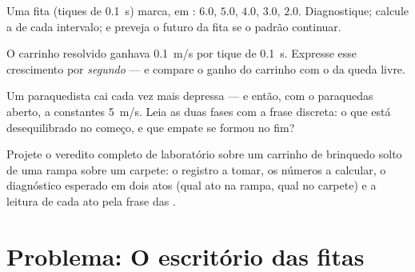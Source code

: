 \begin{exercise}[$\star\star$]\label{exo:g9:uniform-varied-motion:9}
Uma fita (tiques de \qty{0.1}{s}) marca, em : $6.0$,
$5.0$, $4.0$, $3.0$, $2.0$. Diagnostique; calcule a  de
cada intervalo; e preveja o futuro da fita se o padrão continuar.
\end{exercise}

\begin{exercise}[$\star\star$]\label{exo:g9:uniform-varied-motion:10}
O carrinho resolvido ganhava \qty{0.1}{m/s} por tique de
\qty{0.1}{s}. Expresse esse crescimento por \emph{segundo} --- e
compare o ganho do carrinho com o da queda livre.
\end{exercise}

\begin{exercise}[$\star\star$]\label{exo:g9:uniform-varied-motion:11}
Um paraquedista cai cada vez mais depressa --- e então, com o
paraquedas aberto, a constantes \qty{5}{m/s}. Leia as duas fases com
a frase discreta: o que está desequilibrado no começo, e que empate
se formou no fim?
\end{exercise}

\begin{exercise}[$\star\star\star$]\label{exo:g9:uniform-varied-motion:12}
Projete o veredito completo de laboratório sobre um carrinho de
brinquedo solto de uma rampa sobre um carpete: o registro a tomar, os
números a calcular, o diagnóstico esperado em dois atos (qual ato na
rampa, qual no carpete) e a leitura de cada ato pela frase das
.
\end{exercise}

\section{Problema: O escritório das fitas}

